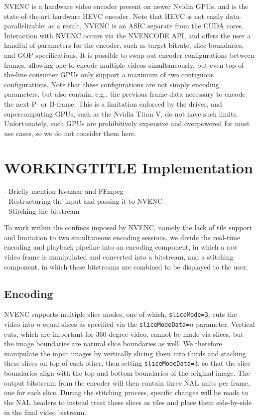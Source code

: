 NVENC is a hardware video encoder present on newer Nvidia GPUs, and is the state-of-the-art hardware HEVC encoder. Note that HEVC is not easily data-parallelizable; as a result, NVENC is an ASIC separate from the CUDA cores. Interaction with NVENC occurs via the NVENCODE API, and offers the user a handful of parameters for the encoder, such as target bitrate, slice boundaries, and GOP specifications. It is possible to swap out encoder configurations between frames, allowing one to encode multiple videos simultaneously, but even top-of-the-line consumer GPUs only support a maximum of two contiguous configurations. Note that these configurations are not simply encoding parameters, but also contain, e.g., the previous frame data necessary to encode the next P- or B-frame. This is a limitation enforced by the driver, and supercomputing GPUs, such as the Nvidia Titan V, do not have such limits. Unfortunately, such GPUs are prohibitively expensive and overpowered for most use cases, so we do not consider them here.

\section{WORKINGTITLE Implementation}
- Briefly mention Kvazaar and FFmpeg \\
- Restructuring the input and passing it to NVENC \\
- Stitching the bitstream

To work within the confines imposed by NVENC, namely the lack of tile support and limitation to two simultaneous encoding sessions, we divide the real-time encoding and playback pipeline into an encoding component, in which a raw video frame is manipulated and converted into a bitstream, and a stitching component, in which these bitstreams are combined to be displayed to the user.

\subsection{Encoding}
NVENC supports multiple slice modes, one of which, \texttt{sliceMode=3}, cuts the video into $n$ equal slices as specified via the \texttt{sliceModeData=}$n$ parameter. Vertical cuts, which are important for 360-degree video, cannot be made via slices, but the image boundaries are natural slice boundaries as well. We therefore manipulate the input images by vertically slicing them into thirds and stacking these slices on top of each other, then setting \texttt{sliceModeData=}$3$, so that the slice boundaries align with the top and bottom boundaries of the original image. The output bitstream from the encoder will then contain three NAL units per frame, one for each slice. During the stitching process, specific changes will be made to the NAL headers to instead treat these slices as tiles and place them side-by-side in the final video bistream.

